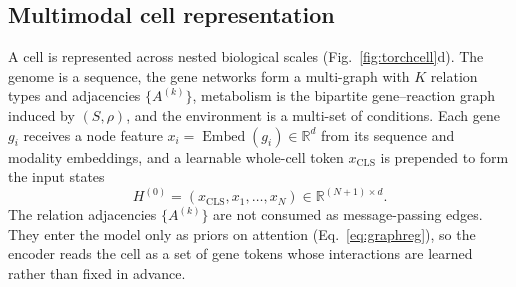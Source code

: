 \subsection*{Multimodal cell representation}
A cell is represented across nested biological scales (Fig.~\ref{fig:torchcell}d). The
genome is a sequence, the gene networks form a multi-graph with $K$ relation types and
adjacencies $\{A^{(k)}\}$, metabolism is the bipartite gene--reaction graph induced by
$(S,\rho)$, and the environment is a multi-set of conditions. Each gene $g_i$ receives a
node feature $x_i=\operatorname{Embed}(g_i)\in\mathbb{R}^{d}$ from its sequence and
modality embeddings, and a learnable whole-cell token $x_{\mathrm{CLS}}$ is prepended to
form the input states
\begin{equation}
H^{(0)}=(x_{\mathrm{CLS}},x_1,\dots,x_N)\in\mathbb{R}^{(N+1)\times d}.
\label{eq:input}
\end{equation}
The relation adjacencies $\{A^{(k)}\}$ are not consumed as message-passing edges. They
enter the model only as priors on attention (Eq.~\ref{eq:graphreg}), so the encoder reads
the cell as a set of gene tokens whose interactions are learned rather than fixed in
advance.

